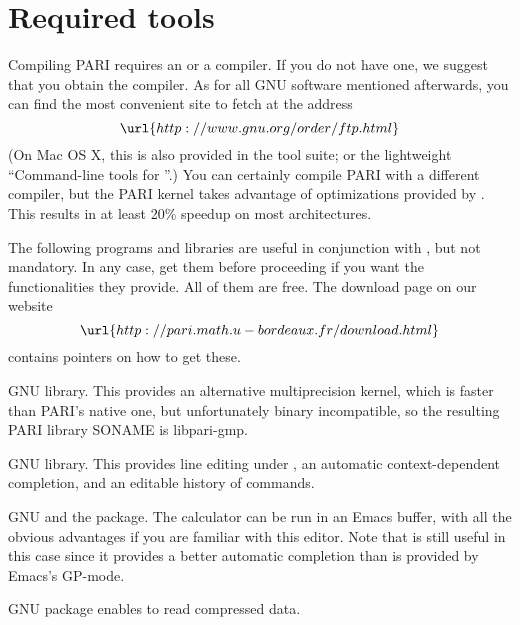 %
%

\def\tocwrite#1{}
\section{Required tools}

Compiling PARI requires an  or a  compiler. If you do
not have one, we suggest that you obtain the  compiler. As for
all GNU software mentioned afterwards, you can find the most convenient site
to fetch  at the address
$$\url{http://www.gnu.org/order/ftp.html}$$
%
(On Mac OS X, this is also provided in the  tool
suite; or the lightweight ``Command-line tools for ''.) You can
certainly compile PARI with a different compiler, but the PARI kernel takes
advantage of optimizations provided by . This results in at least
20\% speedup on most architectures.

 The following programs and libraries are useful
in conjunction with , but not mandatory. In any case, get them before
proceeding if you want the functionalities they provide. All of them are free.
The download page on our website
$$
\url{http://pari.math.u-bordeaux.fr/download.html}
$$
contains pointers on how to get these.

  \item GNU  library. This provides an alternative multiprecision
kernel, which is faster than PARI's native one, but unfortunately binary
incompatible, so the resulting PARI library SONAME is libpari-gmp.

  \item GNU  library. This provides line editing under
, an automatic context-dependent completion, and an editable history
of commands.

  \item GNU  and the  package. The 
calculator can be run in an Emacs buffer, with all the obvious advantages if
you are familiar with this editor. Note that  is still useful
in this case since it provides a better automatic completion than is provided
by Emacs's GP-mode.

  \item GNU  package enables  to read
compressed data.

